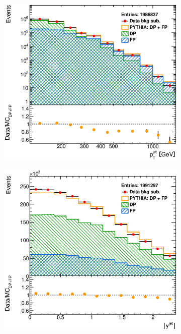 \documentclass[12pt, twoside]{article}
\numberwithin{equation}{section}
\numberwithin{figure}{section}
\newenvironment{changemargin}[2]{%
\begin{list}{}{%
\setlength{\topsep}{0pt}%
\setlength{\leftmargin}{#1}%
\setlength{\rightmargin}{#2}%
\setlength{\listparindent}{\parindent}%
\setlength{\itemindent}{\parindent}%
\setlength{\parsep}{\parskip}%
}%
\item[]}{\end{list}}
\begin{document}
\begin{figure}
\begin{changemargin}{-1.0cm}{-0.75cm}
\begin{changemargin}{-0.75cm}{-1.0cm}
        \vspace{0.2cm}
        \begin{subfigure}[b]{0.37\textwidth}
            \includegraphics[width=\textwidth]{./images/BackgroundSubtractedPythia/SIG_EVENTS-104.eps}
            \subcaption{}
            \label{fig:BSPtJetPYTHIA}
        \end{subfigure}
        \begin{subfigure}[b]{0.37\textwidth}
            \includegraphics[width=\textwidth]{./images/BackgroundSubtractedPythia/SIG_EVENTS-105.eps}

\end{subfigure}
\end{changemargin}
\end{changemargin}
\end{figure}
\end{document}
